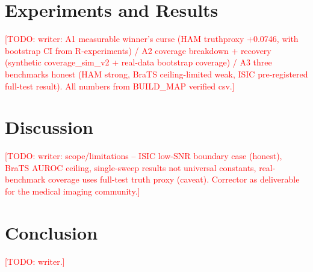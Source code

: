 \documentclass[conference]{IEEEtran}
\newcommand{\todo}[1]{\textcolor{red}{[TODO: #1]}}
\begin{document}
\section{Experiments and Results}
\label{sec:results}
\todo{writer: A1 measurable winner's curse (HAM truthproxy +0.0746, with bootstrap CI from R-experiments) / A2 coverage breakdown + recovery (synthetic coverage\_sim\_v2 + real-data bootstrap coverage) / A3 three benchmarks honest (HAM strong, BraTS ceiling-limited weak, ISIC pre-registered full-test result). All numbers from BUILD\_MAP verified csv.}

\section{Discussion}
\label{sec:discussion}
\todo{writer: scope/limitations -- ISIC low-SNR boundary case (honest), BraTS AUROC ceiling, single-sweep results not universal constants, real-benchmark coverage uses full-test truth proxy (caveat). Corrector as deliverable for the medical imaging community.}

\section{Conclusion}
\todo{writer.}



\end{document}
